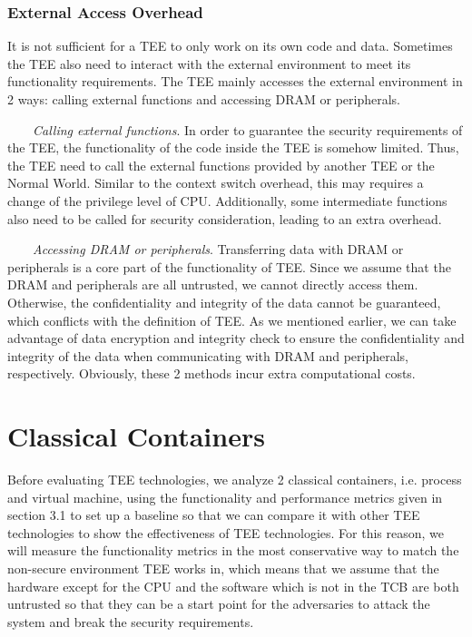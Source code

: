 \documentclass[12pt,twoside]{report}
\begin{document}
\subsubsection{External Access Overhead}

It is not sufficient for a TEE to only work on its own code and data. Sometimes the TEE also need to interact with the external environment to meet its functionality requirements. The TEE mainly accesses the external environment in 2 ways: calling external functions and accessing DRAM or peripherals.  

\ \ \ \ \textit{Calling external functions}. In order to guarantee the security requirements of the TEE, the functionality of the code inside the TEE is somehow limited. Thus, the TEE need to call the external functions provided by another TEE or the Normal World. Similar to the context switch overhead, this may requires a change of the privilege level of CPU. Additionally, some intermediate functions also need to be called for security consideration, leading to an extra overhead. 

\ \ \ \ \textit{Accessing DRAM or peripherals}. Transferring data with DRAM  or peripherals is a core part of the functionality of TEE. Since we assume that the DRAM and peripherals are all untrusted, we cannot directly access them. Otherwise, the confidentiality and integrity of the data cannot be guaranteed, which conflicts with the definition of TEE. As we mentioned earlier, we can take advantage of data encryption and integrity check to ensure the confidentiality and integrity of the data when communicating with DRAM and peripherals, respectively. Obviously, these 2 methods incur extra computational costs.

\section{Classical Containers}

Before evaluating TEE technologies, we analyze 2 classical containers, i.e. process and virtual machine, using the functionality and performance metrics given in section 3.1 to set up a baseline so that we can compare it with other TEE technologies to show the effectiveness of TEE technologies. For this reason, we will measure the functionality metrics in the most conservative way to match the non-secure environment TEE works in, which means that we assume that the hardware except for the CPU and the software which is not in the TCB are both untrusted so that they can be a start point for the adversaries to attack the system and break the security requirements. 
\end{document}
